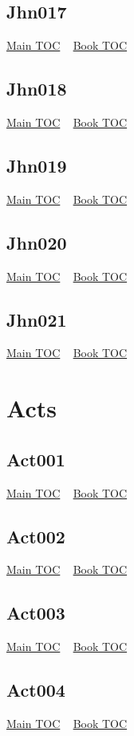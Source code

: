 \documentclass{book}
\begin{document}
  \section{Jhn017}\hyperlink{toc}{Main TOC} ~ \hyperref[subsec:Jhn]{Book TOC} 
  \section{Jhn018}\hyperlink{toc}{Main TOC} ~ \hyperref[subsec:Jhn]{Book TOC} 
  \section{Jhn019}\hyperlink{toc}{Main TOC} ~ \hyperref[subsec:Jhn]{Book TOC} 
  \section{Jhn020}\hyperlink{toc}{Main TOC} ~ \hyperref[subsec:Jhn]{Book TOC} 
  \section{Jhn021}\hyperlink{toc}{Main TOC} ~ \hyperref[subsec:Jhn]{Book TOC} 
  \chapter{Acts} \label{subsec:Act} \begin{multicols}{2} \minitoc \end{multicols}
  \section{Act001}\hyperlink{toc}{Main TOC} ~ \hyperref[subsec:Act]{Book TOC} 
  \section{Act002}\hyperlink{toc}{Main TOC} ~ \hyperref[subsec:Act]{Book TOC} 
  \section{Act003}\hyperlink{toc}{Main TOC} ~ \hyperref[subsec:Act]{Book TOC} 
  \section{Act004}\hyperlink{toc}{Main TOC} ~ \hyperref[subsec:Act]{Book TOC} 
\end{document}
